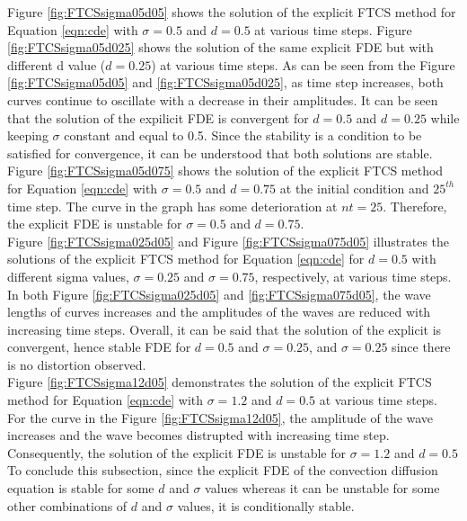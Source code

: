 \documentclass[letterpaper,12pt]{article}
\begin{document}
Figure \ref{fig:FTCSsigma05d05} shows the solution of the explicit FTCS
method for Equation \ref{eqn:cde} with $\sigma= 0.5$ and $d=0.5$ at various time steps.
Figure \ref{fig:FTCSsigma05d025} shows the solution of the same explicit FDE but with 
different d value ($d=0.25$) at various time steps. As can be seen from the Figure \ref{fig:FTCSsigma05d05}
and \ref{fig:FTCSsigma05d025}, as time step increases, both curves continue to oscillate with a decrease in their
amplitudes. It can be seen that the solution of the expilicit FDE is convergent for $d=0.5$
and $d=0.25$ while keeping $\sigma$ constant and equal to 0.5. Since the stability is a condition
to be satisfied for convergence, it can be understood that both solutions are stable. \\
\indent Figure \ref{fig:FTCSsigma05d075} shows the solution of the explicit FTCS
method for Equation \ref{eqn:cde} with $\sigma= 0.5$ and $d=0.75$ at the initial condition
and $25^{th}$ time step. The curve in the graph has some deterioration at $nt = 25$. Therefore,
the explicit FDE is unstable for $\sigma= 0.5$ and $d=0.75$.\\
\indent Figure \ref{fig:FTCSsigma025d05} and Figure \ref{fig:FTCSsigma075d05} illustrates the solutions of the explicit FTCS
method for Equation \ref{eqn:cde} for $d=0.5$ with different sigma values, $\sigma= 0.25$ and $\sigma=0.75$,
respectively, at various time steps. In both Figure \ref{fig:FTCSsigma025d05}
and \ref{fig:FTCSsigma075d05}, the wave lengths of curves increases and the amplitudes of the waves are reduced
with increasing time steps. Overall, it can be said that the solution of the explicit is convergent, hence stable 
FDE for $d=0.5$ and $\sigma = 0.25$, and $\sigma = 0.25$ since there is no distortion observed.\\
\indent Figure \ref{fig:FTCSsigma12d05} demonstrates the solution of the explicit FTCS
method for Equation \ref{eqn:cde} with $\sigma= 1.2$ and $d=0.5$ at various time steps. For the curve in the
Figure \ref{fig:FTCSsigma12d05}, the amplitude of the wave increases and the wave becomes distrupted with 
increasing time step. Consequently, the solution of the explicit FDE is unstable for $\sigma=1.2$ and $d=0.5$\\
\indent To conclude this subsection, since the explicit FDE of the convection diffusion equation is stable for some $d$ 
and $\sigma$ values whereas it can be unstable for some other combinations of $d$ and $\sigma$ values, it is conditionally stable.
\newpage
\end{document}
